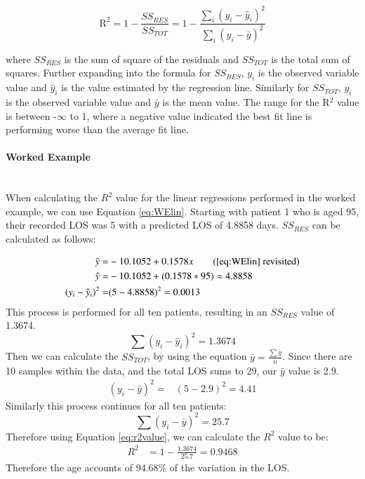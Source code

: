 \documentclass[../thesis.tex]{subfiles}
\begin{document}
\begin{equation}\label{eq:r2value}
    \text{R}^{2} =  1 - \frac{SS_{RES}}{SS_{TOT}} = 1 - \frac{\sum_{i}(y_{i} - \hat y_{i})^{2}}{\sum_{i}(y_{i} - \bar y)^{2}}
\end{equation}

where $SS_{RES}$ is the sum of square of the residuals and $SS_{TOT}$ is the total sum of squares. Further expanding into the formula for $SS_{RES}$, $y_{i}$ is the observed variable value and $\hat y_{i}$ is the value estimated by the regression line. Similarly for $SS_{TOT}$, $y_{i}$ is the observed variable value and $\bar y$ is the mean value.
The range for the R$^{2}$ value is between -$\infty$ to 1, where a negative value indicated the best fit line is performing worse than the average fit line.

\paragraph{Worked Example}\\
When calculating the $R^{2}$ value for the linear regressions performed in the worked example, we can use Equation \eqref{eq:WElin}.
Starting with patient 1 who is aged 95, their recorded LOS was 5 with a predicted LOS of 4.8858 days. $SS_{RES}$ can be calculated as follows:

\begin{align}
    \hat y =& -10.1052 + 0.1578x \tag{\ref{eq:WElin} revisited}\\
    \hat y =& -10.1052 + (0.1578* 95) \approx 4.8858 \\
    (y_{i} -\hat y_{i})^{2} =& (5-4.8858)^{2} = 0.0013
\end{align}
This process is performed for all ten patients, resulting in an $SS_{RES}$ value of 1.3674.
\begin{equation}
    \sum (y_{i} - \hat y_{i})^2 = 1.3674
\end{equation}
Then we can calculate the $SS_{TOT}$, by using the equation $ \bar y = \frac{\sum y}{n}$. Since there are 10 samples within the data, and the total LOS sums to 29, our $\bar y$ value is 2.9. 
\begin{align}
    (y_{i} -\bar y)^{2} =& (5-2.9)^2 = 4.41
\end{align}
Similarly this process continues for all ten patients:
\begin{equation}
    \sum(y_{i} -\bar y)^{2} = 25.7
\end{equation}
Therefore using Equation \eqref{eq:r2value}, we can calculate the $R^2$ value to be:
\begin{align}
    R^{2} &= 1 - \frac{1.3674}{25.7} = 0.9468
\end{align}
Therefore the age accounts of 94.68\% of the variation in the LOS.
\end{document}

